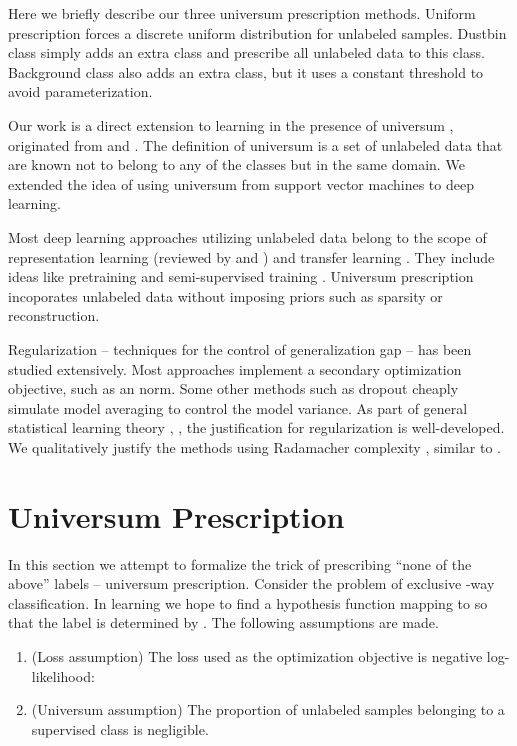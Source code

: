 \documentclass[letterpaper]{article}
\begin{document}
Here we briefly describe our three universum prescription methods. Uniform prescription forces a discrete uniform distribution for unlabeled samples. Dustbin class simply adds an extra class and prescribe all unlabeled data to this class. Background class also adds an extra class, but it uses a constant threshold to avoid parameterization.

Our work is a direct extension to learning in the presence of universum \cite{WCSBV06} \cite{CASS07}, originated from \cite{V98} and \cite{V06}. The definition of universum is a set of unlabeled data that are known not to belong to any of the classes but in the same domain. We extended the idea of using universum from support vector machines to deep learning.

Most deep learning approaches utilizing unlabeled data belong to the scope of representation learning (reviewed by \cite{BCV13} and \cite{BL07}) and transfer learning \cite{TP98}. They include ideas like pretraining \cite{EBCMVB10} \cite{HOT06} \cite{RPCL06} and semi-supervised training \cite{RBHVR15} \cite{ZMGL15}. Universum prescription incoporates unlabeled data without imposing priors such as sparsity or reconstruction.

Regularization -- techniques for the control of generalization gap -- has been studied extensively. Most approaches implement a secondary optimization objective, such as an  norm. Some other methods such as dropout \cite{SHKSS14} cheaply simulate model averaging to control the model variance. As part of general statistical learning theory \cite{V95}, \cite{V98}, the justification for regularization is well-developed. We qualitatively justify the methods using Radamacher complexity \cite{BM03}, similar to \cite{WZZLF13}.

\section{Universum Prescription}
\label{sec:pres}

In this section we attempt to formalize the trick of prescribing ``none of the above'' labels -- universum prescription. Consider the problem of exclusive -way classification. In learning we hope to find a hypothesis function  mapping to  so that the label is determined by . The following assumptions are made.

\begin{enumerate}
\item (Loss assumption) The loss used as the optimization objective is negative log-likelihood:
  
\item (Universum assumption) The proportion of unlabeled samples belonging to a supervised class is negligible.
\end{enumerate}
\end{document}
